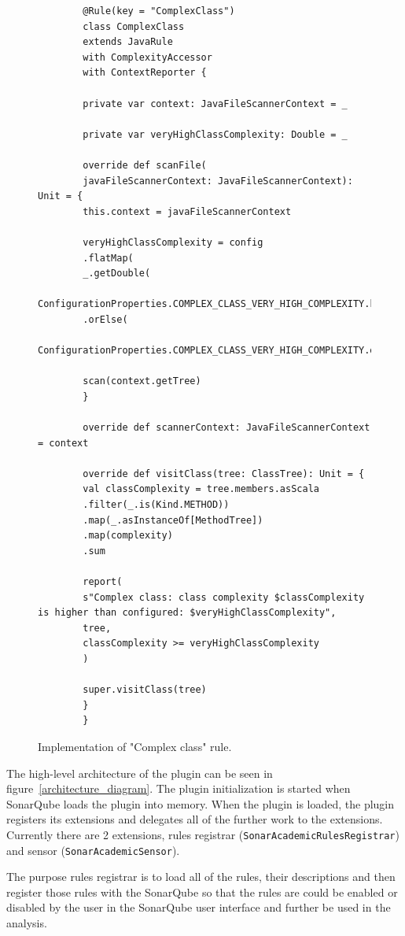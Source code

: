 \begin{figure} [htb]
    \lstset{language=Scala}
    \begin{lstlisting}
        @Rule(key = "ComplexClass")
        class ComplexClass
        extends JavaRule
        with ComplexityAccessor
        with ContextReporter {

        private var context: JavaFileScannerContext = _

        private var veryHighClassComplexity: Double = _

        override def scanFile(
        javaFileScannerContext: JavaFileScannerContext): Unit = {
        this.context = javaFileScannerContext

        veryHighClassComplexity = config
        .flatMap(
        _.getDouble(
        ConfigurationProperties.COMPLEX_CLASS_VERY_HIGH_COMPLEXITY.key))
        .orElse(
        ConfigurationProperties.COMPLEX_CLASS_VERY_HIGH_COMPLEXITY.defaultValue.toDouble)

        scan(context.getTree)
        }

        override def scannerContext: JavaFileScannerContext = context

        override def visitClass(tree: ClassTree): Unit = {
        val classComplexity = tree.members.asScala
        .filter(_.is(Kind.METHOD))
        .map(_.asInstanceOf[MethodTree])
        .map(complexity)
        .sum

        report(
        s"Complex class: class complexity $classComplexity is higher than configured: $veryHighClassComplexity",
        tree,
        classComplexity >= veryHighClassComplexity
        )

        super.visitClass(tree)
        }
        }
    \end{lstlisting}
    \caption{Implementation of "Complex class" rule.}
    \label{complex_class_implementation}
\end{figure}

\FloatBarrier

The high-level architecture of the plugin can be seen in figure~\ref{architecture_diagram}.
The plugin initialization is started when SonarQube loads the plugin into memory.
When the plugin is loaded, the plugin registers its extensions and delegates all of the
further work to the extensions.
Currently there are 2 extensions, rules registrar (\verb|SonarAcademicRulesRegistrar|) and
sensor (\verb|SonarAcademicSensor|).


The purpose rules registrar is to load all of the rules, their descriptions and then register
those rules with the SonarQube so that the rules are could be enabled or disabled by the
user in the SonarQube user interface and further be used in the analysis.


